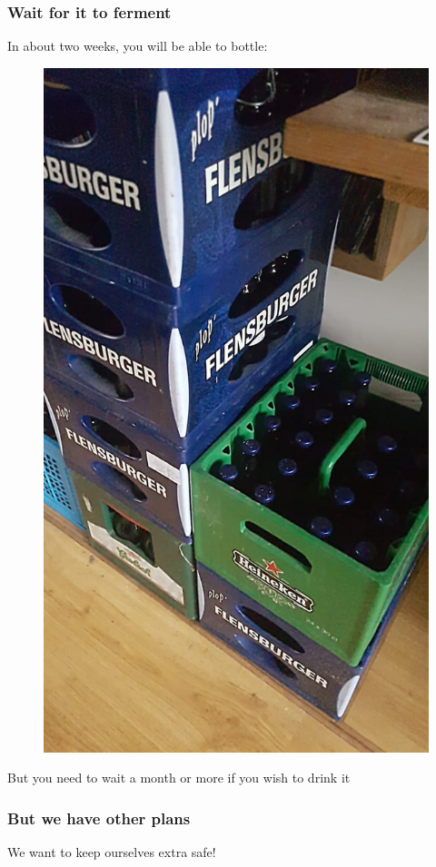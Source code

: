 \documentclass{beamer}
\begin{document}
\begin{frame}
\frametitle{Wait for it to ferment}
In about two weeks, you will be able to bottle:
\begin{figure}
\includegraphics[height=.7\textheight]{images/make-a-batch.jpeg}
\end{figure}
But you need to wait a month or more if you wish to drink it
\end{frame}

\begin{frame}
\frametitle{But we have other plans}
\huge{We want to keep ourselves extra safe!}
\end{frame}
\end{document}
